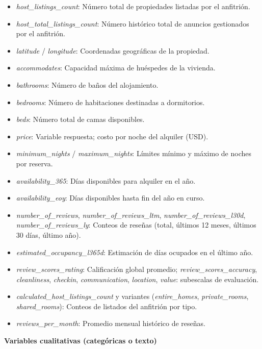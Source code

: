 \documentclass[
]{article}
\providecommand{\tightlist}{%
  \setlength{\itemsep}{0pt}\setlength{\parskip}{0pt}}
\begin{document}
\begin{itemize}
\tightlist
\item
  \emph{host\_listings\_count}: Número total de propiedades listadas por
  el anfitrión.
\item
  \emph{host\_total\_listings\_count}: Número histórico total de
  anuncios gestionados por el anfitrión.
\item
  \emph{latitude} / \emph{longitude}: Coordenadas geográficas de la
  propiedad.
\item
  \emph{accommodates}: Capacidad máxima de huéspedes de la vivienda.
\item
  \emph{bathrooms}: Número de baños del alojamiento.
\item
  \emph{bedrooms}: Número de habitaciones destinadas a dormitorios.
\item
  \emph{beds}: Número total de camas disponibles.
\item
  \emph{price}: Variable respuesta; costo por noche del alquiler (USD).
\item
  \emph{minimum\_nights} / \emph{maximum\_nights}: Límites mínimo y
  máximo de noches por reserva.
\item
  \emph{availability\_365}: Días disponibles para alquiler en el año.
\item
  \emph{availability\_eoy}: Días disponibles hasta fin del año en curso.
\item
  \emph{number\_of\_reviews}, \emph{number\_of\_reviews\_ltm},
  \emph{number\_of\_reviews\_l30d}, \emph{number\_of\_reviews\_ly}:
  Conteos de reseñas (total, últimos 12 meses, últimos 30 días, último
  año).
\item
  \emph{estimated\_occupancy\_l365d}: Estimación de días ocupados en el
  último año.
\item
  \emph{review\_scores\_rating}: Calificación global promedio;
  \emph{review\_scores\_accuracy}, \emph{cleanliness}, \emph{checkin},
  \emph{communication}, \emph{location}, \emph{value}: subescalas de
  evaluación.
\item
  \emph{calculated\_host\_listings\_count} y variantes
  (\emph{entire\_homes}, \emph{private\_rooms}, \emph{shared\_rooms}):
  Conteos de listados del anfitrión por tipo.
\item
  \emph{reviews\_per\_month}: Promedio mensual histórico de reseñas.
\end{itemize}

\textbf{Variables cualitativas (categóricas o texto)}
\end{document}
